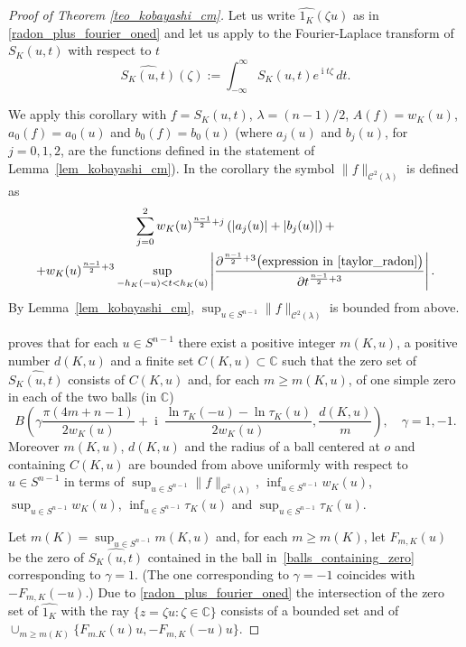 \documentclass[a4paper]{amsart}
\theoremstyle{definition}
\numberwithin{equation}{section}
\begin{document}
\begin{proof}[Proof of Theorem \ref{teo_kobayashi_cm}]Let us write ${\widehat{{{1_K}}}}({{\zeta}} u)$ as in \eqref{radon_plus_fourier_oned} and let us apply \cite[Corollary 2.20]{Kob2} to the Fourier-Laplace transform of $S_K(u,t)$ with respect to $t$
\begin{equation}\label{FT_radon}
 {\widehat{{{S_K(u,t)}}}}({{\zeta}}):=\int_{-\infty}^{\infty}S_K(u,t)e^{{\operatorname{i}} t{{\zeta}}}\,dt.
\end{equation}

We apply this corollary with $f=S_K(u,t)$, $\lambda=(n-1)/2$, $A(f)={{{w}}}_K(u)$, $a_0(f)=a_0(u)$ and $b_0(f)=b_0(u)$ (where $a_j(u)$ and $b_j(u)$, for $j=0,1,2$, are the functions defined in the statement of Lemma~\ref{lem_kobayashi_cm}).  In the corollary the symbol $\|f\|_{\mathcal{C}^2(\lambda)}$ is defined as
\begin{multline*}
 \sum_{j=0}^2{{{w}}}_K(u)^{\frac{n-1}{2}+j}\left(|a_j(u)|+|b_j(u)|\right)+\\
 +{{{w}}}_K(u)^{\frac{n-1}{2}+3}\sup_{-h_K(-u)< t< h_K(u)}\left|\frac{{{\partial}}^{\frac{n-1}{2}+3}\big(\text{expression in \eqref{taylor_radon}}\big)}{{{\partial}} t^{\frac{n-1}{2}+3}}\right|.
\end{multline*}
By Lemma~\ref{lem_kobayashi_cm}, $\sup_{u\in{S^{n-1}}}\|f\|_{\mathcal{C}^2(\lambda)}$ is bounded from above.

\cite[Corollary 2.20]{Kob2} proves that for each $u\in{S^{n-1}}$ there exist a positive integer $m(K,u)$, a positive number $d(K,u)$ and a finite set $C(K,u)\subset{\mathbb{C}}$ such that the zero set of ${\widehat{{{S_K(u,t)}}}}$ consists of  $C(K,u)$ and, for each $m\geq m(K,u)$, of one simple zero in each  of the two balls (in ${\mathbb{C}}$)
\begin{equation}\label{balls_containing_zero}
 B\left(
 {{\gamma}}\frac{\pi(4m+n-1)}{2w_K(u)}+{\operatorname{i}}\ \frac{\ln {\tau}_K(-u)-\ln {\tau}_K(u)}{2w_K(u)},\frac{d(K,u)}{m}
 \right),
 \quad\text{${{\gamma}}=1,-1$.}
\end{equation}
Moreover $m(K,u)$, $d(K,u)$ and the radius of a ball centered at $o$ and containing $C(K,u)$ are bounded from above uniformly with respect to $u\in{S^{n-1}}$ in terms of $\sup_{u\in{S^{n-1}}}\|f\|_{\mathcal{C}^2(\lambda)}$, $\inf_{u\in{S^{n-1}}}{{{w}}}_K(u)$, $\sup_{u\in{S^{n-1}}}{{{w}}}_K(u)$, $\inf_{u\in{S^{n-1}}}{\tau}_K(u)$ and $\sup_{u\in{S^{n-1}}}{\tau}_K(u)$.

Let $m(K)=\sup_{u\in{S^{n-1}}}m(K,u)$ and, for each $m\geq m(K)$, let $F_{m,K}(u)$ be the zero of ${\widehat{{{S_K(u,t)}}}}$ contained in the ball in~\eqref{balls_containing_zero} corresponding to ${{\gamma}}=1$. (The one corresponding to ${{\gamma}}=-1$ coincides with $-F_{m,K}(-u)$.)
Due to \eqref{radon_plus_fourier_oned} the intersection of the zero set of ${\widehat{{{1_K}}}}$ with the ray $\{z={{\zeta}} u:{{\zeta}}\in{\mathbb{C}}\}$ consists of a bounded set and of $\cup_{m\geq m(K)}\{F_{m.K}(u)u, -F_{m,K}(-u)u\}$.


\end{proof}
\end{document}
